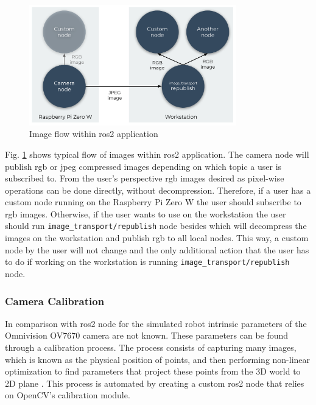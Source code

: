 \begin{figure}[H]
    \centering
    \includegraphics[width=0.8\textwidth]{physical/figures/camera_ros_images.pdf}
    \caption{Image flow within \ac{ros2} application}
    \label{fig:physical:camera_ros_images}
\end{figure}

Fig. \ref{fig:physical:camera_ros_images} shows typical flow of images within \ac{ros2} application. The camera node will publish \acs{rgb} or \acs{jpeg} compressed images depending on which topic a user is subscribed to. From the user's perspective \ac{rgb} images desired as pixel-wise operations can be done directly, without decompression. Therefore, if a user has a custom node running on the Raspberry Pi Zero W the user should subscribe to \ac{rgb} images. Otherwise, if the user wants to use on the workstation the user should run \texttt{image\_transport/republish} node besides which will decompress the images on the workstation and publish \ac{rgb} to all local nodes. This way, a custom node by the user will not change and the only additional action that the user has to do if working on the workstation is running \texttt{image\_transport/republish} node.
 
\subsubsection{Camera Calibration}
In comparison with \ac{ros2} node for the simulated robot intrinsic parameters of the Omnivision OV7670 camera are not known. These parameters can be found through a calibration process. The process consists of capturing many images, which is known as the physical position of points, and then performing non-linear optimization to find parameters that project these points from the 3D world to 2D plane \cite{lukic_dual_nodate}. This process is automated by creating a custom \ac{ros2} node that relies on OpenCV's calibration module.

